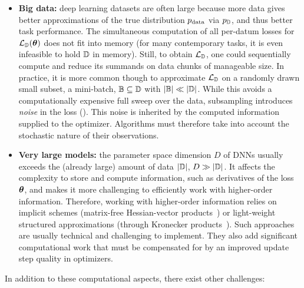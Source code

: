 \begin{itemize}

\item \textbf{Big data:} deep learning datasets are often large because more
  data gives better approximations of the true distribution $p_{\mathrm{data}}$ via
  $p_{{\mathbb{D}}}$, and thus better task performance. The simultaneous computation of
  all per-datum losses for ${\mathcal{L}}_{{\mathbb{D}}}({\bm{\theta}})$ does not fit into memory (for
  many contemporary tasks, it is even infeasible to hold ${\mathbb{D}}$ in
  memory). Still, to obtain ${\mathcal{L}}_{{\mathbb{D}}}$, one could sequentially compute and reduce
  its summands on data chunks of manageable size. In practice, it is more common
  though to approximate ${\mathcal{L}}_{{\mathbb{D}}}$ on a randomly drawn small subset, a
  mini-batch, ${\mathbb{B}} \subseteq {\mathbb{D}}$ with $|{\mathbb{B}}| \ll |{\mathbb{D}}|$. While this avoids a
  computationally expensive full sweep over the data, subsampling introduces
  \emph{noise} in the loss (). This noise is
  inherited by the computed information supplied to the optimizer. Algorithms
  must therefore take into account the stochastic nature of their observations.

\item \textbf{Very large models:} the parameter space dimension $D$ of DNNs
  usually exceeds the (already large) amount of data $|{\mathbb{D}}|$, \ie $D \gg |{\mathbb{D}}|$.
  It affects the complexity to store and compute information, such as
  derivatives of the loss \wrt ${\bm{\theta}}$, and makes it more challenging to
  efficiently work with higher-order information. Therefore, working with higher-order information relies on implicit schemes
  (\eg matrix-free Hessian-vector products~\cite{pearlmutter1994fast}) or
  light-weight structured approximations (\eg through Kronecker
  products~\cite{martens2015optimizing}). Such approaches are usually technical
  and challenging to implement. They also add significant computational work
  that must be compensated for by an improved update step quality in optimizers.
\end{itemize}
In addition to these computational aspects, there exist other challenges:
